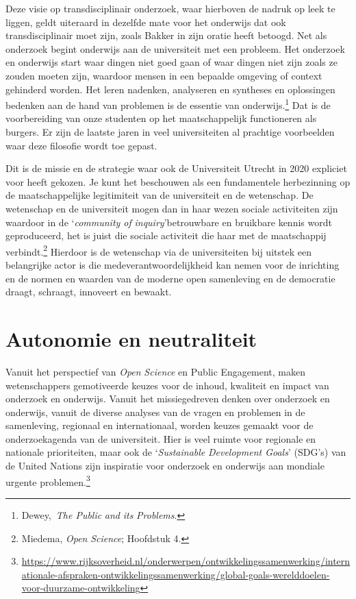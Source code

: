 \documentclass[smallauthor, chapterhaspagenum, nochapterinheader, pagenuminheader,  bigchapnum,medium2, tocpages, garamond, titleinheader]{jote-book}
\begin{document}
	Deze visie op transdisciplinair onderzoek, waar hierboven de nadruk op leek te liggen, geldt uiteraard in dezelfde mate voor het onderwijs dat ook transdisciplinair moet zijn, zoals Bakker in zijn oratie heeft betoogd. Net als onderzoek begint onderwijs aan de universiteit met een probleem. Het onderzoek en onderwijs start waar dingen niet goed gaan of waar dingen niet zijn zoals ze zouden moeten zijn, waardoor mensen in een bepaalde omgeving of context gehinderd worden. Het leren nadenken, analyseren en syntheses en oplossingen bedenken aan de hand van problemen is de essentie van onderwijs.\footnote{Dewey, \emph{The Public }\emph{and}\emph{ }\emph{its}\emph{ }\emph{Problems}.} Dat is de voorbereiding van onze studenten op het maatschappelijk functioneren als burgers. Er zijn de laatste jaren in veel universiteiten al prachtige voorbeelden waar deze filosofie wordt toe gepast.



	Dit is de missie en de strategie waar ook de Universiteit Utrecht in 2020 expliciet voor heeft gekozen. Je kunt het beschouwen als een fundamentele herbezinning op de maatschappelijke legitimiteit van de universiteit en de wetenschap. De wetenschap en de universiteit mogen dan in haar wezen sociale activiteiten zijn waardoor in de ‘\emph{community of }\emph{inquiry}'betrouwbare en bruikbare kennis wordt geproduceerd, het is juist die sociale activiteit die haar met de maatschappij verbindt.\footnote{Miedema, \emph{Open }\emph{Science}; Hoofdstuk 4.} Hierdoor is de wetenschap via de universiteiten bij uitstek een belangrijke actor is die medeverantwoordelijkheid kan nemen voor de inrichting en de normen en waarden van de moderne open samenleving en de democratie draagt, schraagt, innoveert en bewaakt.



	\section{Autonomie en neutraliteit}



	Vanuit het perspectief van \emph{Open }\emph{Science} en Public Engagement, maken wetenschappers gemotiveerde keuzes voor de inhoud, kwaliteit en impact van onderzoek en onderwijs. Vanuit het missiegedreven denken over onderzoek en onderwijs, vanuit de diverse analyses van de vragen en problemen in de samenleving, regionaal en internationaal, worden keuzes gemaakt voor de onderzoekagenda van de universiteit. Hier is veel ruimte voor regionale en nationale prioriteiten, maar ook de ‘\emph{Sustainable}\emph{ Development Goals}' (SDG's) van de United Nations zijn inspiratie voor onderzoek en onderwijs aan mondiale urgente problemen.\footnote{\href{https://www.rijksoverheid.nl/onderwerpen/ontwikkelingssamenwerking/internationale-afspraken-ontwikkelingssamenwerking/global-goals-werelddoelen-voor-duurzame-ontwikkeling}{https://www.rijksoverheid.nl/onderwerpen/ontwikkelingssamenwerking/internationale-afspraken-ontwikkelingssamenwerking/global-goals-werelddoelen-voor-duurzame-ontwikkeling}}
\end{document}
